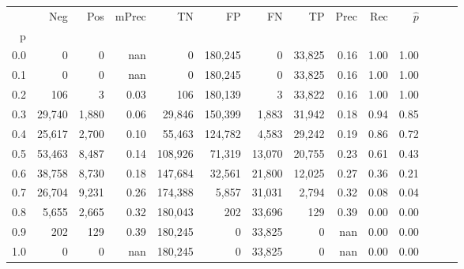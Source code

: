 \begin{tabular}{rrrrrrrrrrrrrr}
\toprule
{} &     Neg &    Pos & mPrec &       TN &       FP &      FN &      TP &  Prec &   Rec & $\hat{p}$ \\
p   &         &        &       &          &          &         &         &       &       &           \\
\midrule
0.0 &       0 &      0 &   nan &        0 &  180,245 &       0 &  33,825 &  0.16 &  1.00 &      1.00 \\
0.1 &       0 &      0 &   nan &        0 &  180,245 &       0 &  33,825 &  0.16 &  1.00 &      1.00 \\
0.2 &     106 &      3 &  0.03 &      106 &  180,139 &       3 &  33,822 &  0.16 &  1.00 &      1.00 \\
0.3 &  29,740 &  1,880 &  0.06 &   29,846 &  150,399 &   1,883 &  31,942 &  0.18 &  0.94 &      0.85 \\
0.4 &  25,617 &  2,700 &  0.10 &   55,463 &  124,782 &   4,583 &  29,242 &  0.19 &  0.86 &      0.72 \\
0.5 &  53,463 &  8,487 &  0.14 &  108,926 &   71,319 &  13,070 &  20,755 &  0.23 &  0.61 &      0.43 \\
0.6 &  38,758 &  8,730 &  0.18 &  147,684 &   32,561 &  21,800 &  12,025 &  0.27 &  0.36 &      0.21 \\
0.7 &  26,704 &  9,231 &  0.26 &  174,388 &    5,857 &  31,031 &   2,794 &  0.32 &  0.08 &      0.04 \\
0.8 &   5,655 &  2,665 &  0.32 &  180,043 &      202 &  33,696 &     129 &  0.39 &  0.00 &      0.00 \\
0.9 &     202 &    129 &  0.39 &  180,245 &        0 &  33,825 &       0 &   nan &  0.00 &      0.00 \\
1.0 &       0 &      0 &   nan &  180,245 &        0 &  33,825 &       0 &   nan &  0.00 &      0.00 \\
\bottomrule
\end{tabular}

